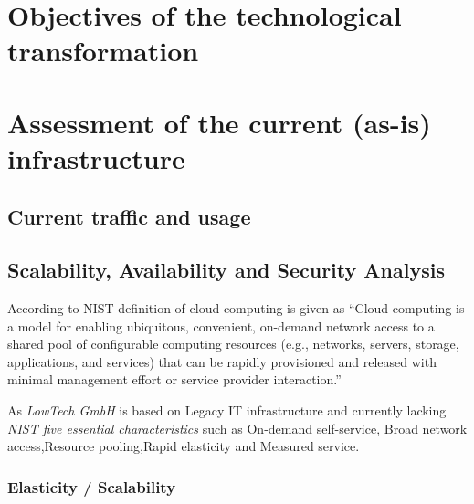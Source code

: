 \documentclass{llncs}
\begin{document}
\section{Objectives of the technological transformation}


\section{Assessment of the current (as-is) infrastructure}

\subsection{Current traffic and usage}

\subsection{Scalability, Availability and Security Analysis}
According to NIST definition of cloud computing is given as ``Cloud computing is a model for enabling ubiquitous, convenient, on-demand network access to a shared
pool of configurable computing resources (e.g., networks, servers, storage, applications, and services) that
can be rapidly provisioned and released with minimal management effort or service provider interaction.'' \cite{mell2011nist}

As \textit{LowTech GmbH} is based on Legacy IT infrastructure and currently lacking \textit{NIST five
essential characteristics} such as On-demand self-service, Broad network access,Resource pooling,Rapid elasticity and Measured service.

\subsubsection*{Elasticity / Scalability}
\end{document}
